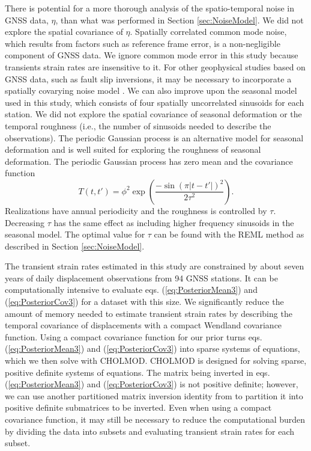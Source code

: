 \documentclass[extra,mreferee]{gji}
\begin{document}
There is potential for a more thorough analysis of the spatio-temporal noise in GNSS data, $\eta$, than what was performed in Section \ref{sec:NoiseModel}. We did not explore the spatial covariance of $\eta$. Spatially correlated common mode noise, which results from factors such as reference frame error, is a non-negligible component of GNSS data. We ignore common mode error in this study because transients strain rates are insensitive to it. For other geophysical studies based on GNSS data, such as fault slip inversions, it may be necessary to incorporate a spatially covarying noise model \citep[e.g.,][]{Miyazaki2003}. We can also improve upon the seasonal model used in this study, which consists of four spatially uncorrelated sinusoids for each station. We did not explore the spatial covariance of seasonal deformation or the temporal roughness (i.e., the number of sinusoids needed to describe the observations). The periodic Gaussian process \citep{Mackay1998} is an alternative model for seasonal deformation and is well suited for exploring the roughness of seasonal deformation.  The periodic Gaussian process has zero mean and the covariance function
\begin{equation}\label{eq:Periodic}
T(t,t') = \phi^2 \exp\left(\frac{-\sin(\pi|t - t'|)^2}{2\tau^2}\right).
\end{equation}
Realizations have annual periodicity and the roughness is controlled by $\tau$. Decreasing $\tau$ has the same effect as including higher frequency sinusoids in the seasonal model. The optimal value for $\tau$ can be found with the REML method as described in Section \ref{sec:NoiseModel}. 

The transient strain rates estimated in this study are constrained by about seven years of daily displacement observations from 94 GNSS stations. It can be computationally intensive to evaluate eqs. (\ref{eq:PosteriorMean3}) and (\ref{eq:PosteriorCov3}) for a dataset with this size. We significantly reduce the amount of memory needed to estimate transient strain rates by describing the temporal covariance of displacements with a compact Wendland covariance function. Using a compact covariance function for our prior turns eqs. (\ref{eq:PosteriorMean3}) and (\ref{eq:PosteriorCov3}) into sparse systems of equations, which we then solve with CHOLMOD. CHOLMOD is designed for solving sparse, positive definite systems of equations. The matrix being inverted in eqs. (\ref{eq:PosteriorMean3}) and (\ref{eq:PosteriorCov3}) is not positive definite; however, we can use another partitioned matrix inversion identity from \citet{Press2007} to partition it into positive definite submatrices to be inverted. Even when using a compact covariance function, it may still be necessary to reduce the computational burden by dividing the data into subsets and evaluating transient strain rates for each subset.   
\end{document}
